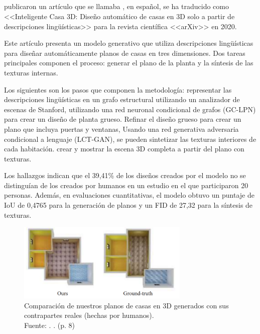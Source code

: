 \subsection{}
\cite{pr_chen2020intelhome3d} publicaron un artículo que se llamaba , en español, se ha traducido como <<Inteligente Casa 3D: Diseño automático de casas en 3D solo a partir de descripciones lingüísticas>> para la revista científica <<arXiv>> en 2020.

Este artículo presenta un modelo generativo que utiliza descripciones lingüísticas para diseñar automáticamente planos de casas en tres dimensiones. Dos tareas principales componen el proceso: generar el plano de la planta y la síntesis de las texturas internas.

Los siguientes son los pasos que componen la metodología: representar las descripciones lingüísticas en un grafo estructural utilizando un analizador de escenas de Stanford, utilizando una red neuronal condicional de grafos (GC-LPN) para crear un diseño de planta grueso. Refinar el diseño grueso para crear un plano que incluya puertas y ventanas, Usando una red generativa adversaria condicional a lenguaje (LCT-GAN), se pueden sintetizar las texturas interiores de cada habitación. crear y mostrar la escena 3D completa a partir del plano con texturas.

Los hallazgos indican que el 39,41\% de los diseños creados por el modelo no se distinguían de los creados por humanos en un estudio en el que participaron 20 personas. Además, en evaluaciones cuantitativas, el modelo obtuvo un puntaje de IoU de 0,4765 para la generación de planos y un FID de 27,32 para la síntesis de texturas.

\begin{figure}[!ht]
	\begin{center}
		\includegraphics[width=0.73\textwidth]{2/figures/chen2020.png}
		\caption[Comparación de nuestros planos de casas en 3D generados con sus contrapartes reales (hechas por humanos)]{Comparación de nuestros planos de casas en 3D generados con sus contrapartes reales (hechas por humanos).\\
		Fuente: \cite{pr_chen2020intelhome3d}. . (p. 8)}
		\label{2:fig122}
	\end{center}
\end{figure}


